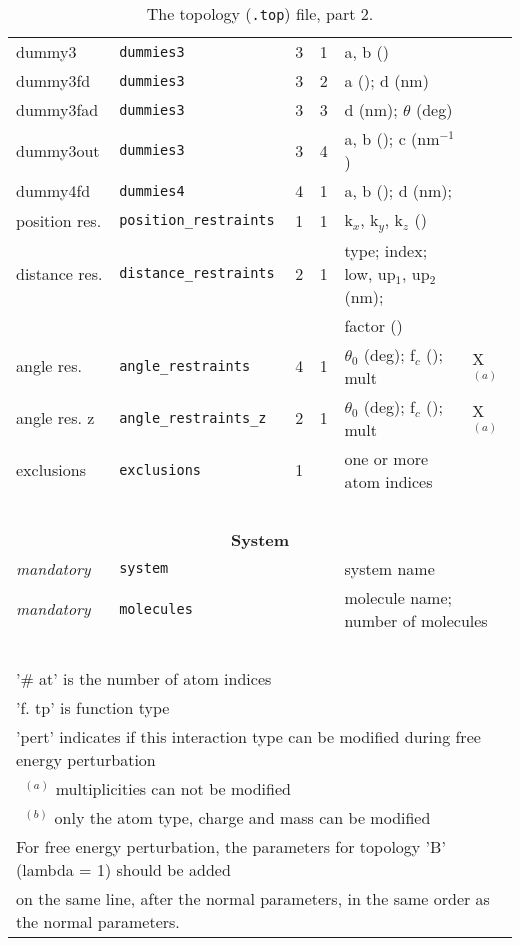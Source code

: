 \begin{table}[p]
{\begin{tabular}{|l|lllll|}
dummy3		& {\tt dummies3}	& 3 & 1	& a, b ()				& 	\\
dummy3fd	& {\tt dummies3}	& 3 & 2	& a (); d (nm)				& 	\\
dummy3fad	& {\tt dummies3}	& 3 & 3	& d (nm); $\theta$ (deg) 		& 	\\
dummy3out	& {\tt dummies3}	& 3 & 4	& a, b (); c (nm$^{-1}$) 		& 	\\
dummy4fd	& {\tt dummies4}	& 4 & 1	& a, b (); d (nm);	   		& 	\\
position res.	& {\tt position\_restraints}	& 1 & 1	& k$_{x}$, k$_{y}$, k$_{z}$ (\kJmolnm{-2}) & 	\\
distance res.	& {\tt distance\_restraints}	& 2 & 1	& type; index; low, up$_1$, up$_2$ (nm); & \\
 & & & & factor () & \\
angle res.	& {\tt angle\_restraints}	& 4 & 1	& $\theta_0$ (deg); f$_c$ (\kJmol); mult & X$^{(a)}$	\\
angle res. z & {\tt angle\_restraints\_z}	& 2 & 1	& $\theta_0$ (deg); f$_c$ (\kJmol); mult & X$^{(a)}$	\\
exclusions	& {\tt exclusions}	& 1 & 	& one or more atom indices				& 	\\
\hline
\multicolumn{6}{c}{~} \\
\multicolumn{6}{c}{\bf \large System} \\
\hline
{\em mandatory} & {\tt system}		& & &	system name				&	\\
\hline
{\em mandatory} & {\tt molecules}	& & &	\multicolumn{2}{l|}{molecule name; number of molecules}	\\
\hline
\multicolumn{6}{c}{~} \\
\multicolumn{6}{l}{'\# at' is the number of atom indices} \\
\multicolumn{6}{l}{'f. tp' is function type} \\
\multicolumn{6}{l}{'pert' indicates if this interaction type
can be modified during free energy perturbation} \\
\multicolumn{6}{l}{~$^{(a)}$ multiplicities can not be modified} \\
\multicolumn{6}{l}{~$^{(b)}$ only the atom type, charge and mass can be modified} \\
\multicolumn{6}{l}{For free energy perturbation, the parameters for topology 'B' (lambda = 1) should be added} \\
\multicolumn{6}{l}{on the same line, after the normal parameters,
in the same order as the normal parameters.} \\
\end{tabular}
}
\caption{The topology ({\tt *.top}) file, part 2.}
\label{ta:topfile2}
\end{table}

